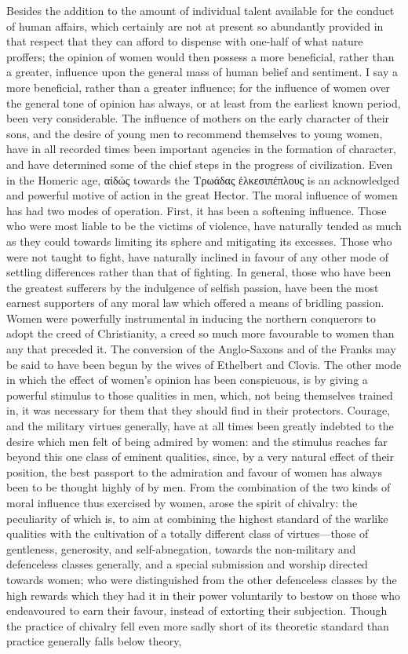 \documentclass[12pt]{report}
\begin{document}
Besides the addition to the amount of individual talent available for the conduct of human affairs, which certainly are not at present so abundantly provided in that respect that they can afford to dispense with one-half of what nature proffers; the opinion of women would then possess a more beneficial, rather than a greater, influence upon the general mass of human belief and sentiment. I say a more beneficial, rather than a greater influence; for the influence of women over the general tone of opinion has always, or at least from the earliest known period, been very considerable. The influence of mothers on the early character of their sons, and the desire of young men to recommend themselves to young women, have in all recorded times been important agencies in the formation of character, and have determined some of the chief steps in the progress of civilization. Even in the Homeric age, \textgreek{αἰδώς} towards the \textgreek{Τρωάδας ἑλκεσιπέπλους} is an acknowledged and powerful motive of action in the great Hector. The moral influence of women has had two modes of operation. First, it has been a softening influence. Those who were most liable to be the victims of violence, have naturally tended as much as they could towards limiting its sphere and mitigating its excesses. Those who were not taught to fight, have naturally inclined in favour of any other mode of settling differences rather than that of fighting. In general, those who have been the greatest sufferers by the indulgence of selfish passion, have been the most earnest supporters of any moral law which offered a means of bridling passion. Women were powerfully instrumental in inducing the northern conquerors to adopt the creed of Christianity, a creed so much more favourable to women than any that preceded it. The conversion of the Anglo-Saxons and of the Franks may be said to have been begun by the wives of Ethelbert and Clovis. The other mode in which the effect of women's opinion has been conspicuous, is by giving a powerful stimulus to those qualities in men, which, not being themselves trained in, it was necessary for them that they should find in their protectors. Courage, and the military virtues generally, have at all times been greatly indebted to the desire which men felt of being admired by women: and the stimulus reaches far beyond this one class of eminent qualities, since, by a very natural effect of their position, the best passport to the admiration and favour of women has always been to be thought highly of by men. From the combination of the two kinds of moral influence thus exercised by women, arose the spirit of chivalry: the peculiarity of which is, to aim at combining the highest standard of the warlike qualities with the cultivation of a totally different class of virtues—those of gentleness, generosity, and self-abnegation, towards the non-military and defenceless classes generally, and a special submission and worship directed towards women; who were distinguished from the other defenceless classes by the high rewards which they had it in their power voluntarily to bestow on those who endeavoured to earn their favour, instead of extorting their subjection. Though the practice of chivalry fell even more sadly short of its theoretic standard than practice generally falls below theory, 
\end{document}
